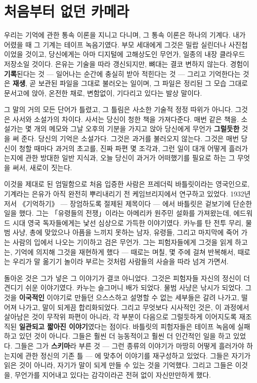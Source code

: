 \section*{처음부터 없던 카메라}

우리는 기억에 관한 통속 이론을 지니고 다니며, 그 통속 이론은 하나의 기계다. 내가 어렸을 때 그 기계는 테이프 녹음기였다. 부모 세대에게 그것은 밀랍 실린더나 사진첩이었을 것이고, 당신에게는 아마 디지털에 고해상도인 무언가, 일종의 내장 클라우드 저장소일 것이다. 은유는 기술을 따라 갱신되지만, 뼈대는 결코 변하지 않는다. 경험이 \textbf{기록}된다는 것 — 일어나는 순간에 충실히 받아 적힌다는 것 — 그리고 기억한다는 것은 \textbf{재생}, 곧 보관된 파일을 그대로 불러오는 일이며, 그 파일은 정리된 그 모습 그대로 문서고에 앉아, 온전한 채로, 변함없이, 기다리고 있다는 발상 말이다.

그 말의 거의 모든 단어가 틀렸고, 그 틀림은 사소한 기술적 정정 따위가 아니다. 그것은 사서와 소설가의 차이다. 사서는 당신이 청한 책을 가져다준다. 매번 같은 책을. 소설가는 몇 개의 메모와 그날 오후의 기분을 가지고 앉아 당신에게 무언가 \textbf{그럴듯한} 것을 써 준다. 당신의 기억은 소설가다. 그것은 과거를 불러오지 않는다. 그것은 매번 당신이 청할 때마다 과거의 초고를, 진짜 파편 몇 조각과, 그런 일이 대개 어떻게 흘러가는지에 관한 방대한 일반 지식과, 오늘 당신이 과거가 어떠했기를 필요로 하는 그 무엇을 써서, 새로이 짓는다.

이것을 제대로 된 엄밀함으로 처음 입증한 사람은 프레더릭 바틀릿이라는 영국인으로, 기계라는 은유가 아직 완전히 뿌리내리기 전 케임브리지에서 연구하고 있었다. 1932년 저서 《기억하기》 — 장엄하도록 절제된 제목이다 — 에서 바틀릿은 겉보기에 단순한 일을 했다. 그는 「유령들의 전쟁」이라는 아메리카 원주민 설화를 가져왔는데, 에드워드 시대 영국 독자들에게는 낯선 심상으로 가득한 이야기였다. 카누를 탄 전투 무리, 물범 사냥, 총에 맞았으나 아픔을 느끼지 못하는 남자, 유령들, 그리고 마지막에 죽어 가는 사람의 입에서 나오는 기이하고 검은 무언가. 그는 피험자들에게 그것을 읽게 하고는, 기억에 의지해 그것을 재현하게 했다 — 때로는 며칠, 몇 주에 걸쳐 반복해서, 때로는 우리가 말 옮기기 놀이라 부르는 것처럼 사람들의 사슬을 따라 넘겨 가면서.

돌아온 것은 그가 넣은 그 이야기가 결코 아니었다. 그것은 피험자들 자신의 정신이 더 견디기 쉬운 이야기였다. 카누는 슬그머니 배가 되었다. 물범 사냥은 낚시가 되었다. 그것을 \textbf{이국적인} 이야기로 만들던 으스스하고 설명할 수 없는 세부들은 갈려 나가고, 떨어져 나가고, 말이 되게끔 합리화되었다. 그리고 무엇보다 시사적인 것은, 이 과정에서 살아남은 것이 무작위 파편이 아니라, 각 부분이 다음으로 그럴듯하게 이어지도록 재조직된 \textbf{일관되고 짧아진 이야기}였다는 점이다. 바틀릿의 피험자들은 테이프 녹음에 실패하고 있던 것이 아니다. 그들은 훨씬 더 능동적이고 훨씬 더 인간적인 일을 하고 있었다. 그들은 그가 \textbf{스키마}라 부른 것 — 그런 종류의 이야기가 마땅히 어떻게 흘러가야 하는지에 관한 정신의 기존 틀 — 에 맞추어 이야기를 재구성하고 있었다. 그들은 자기가 읽은 것이 아니라, 자기가 말이 되게 만들 수 있는 것을 기억했다. 그리고 그들은 이것을, 무언가를 지어내고 있다는 감각이라곤 전혀 없이 자신만만하게 했다.

